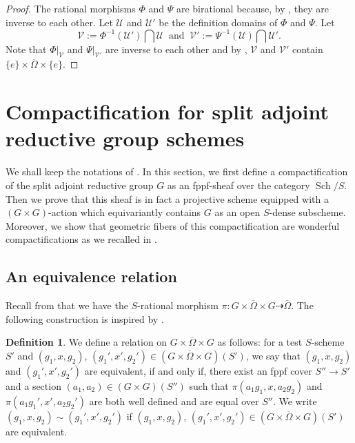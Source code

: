 \documentclass[11pt, reqno]{amsart}
\theoremstyle{plain}
\theoremstyle{definition}
\newtheorem{definition}[theorem]{Definition}
\DeclareMathOperator{\Sch}{Sch}
\begin{document}
\begin{proof}
    The rational morphisms $\Phi$ and $\Psi$ are birational because, by , they are inverse to each other. 
    Let $\mathcal{U}$ and $\mathcal{U}'$ be the definition domains of $\Phi$ and $\Psi$. 
    Let $$\mathcal{V}:=\Phi^{-1}(\mathcal{U'})\bigcap \mathcal{U}\;\; \text{and}\;\; \mathcal{V}':=\Psi^{-1}(\mathcal{U})\bigcap \mathcal{U}'.$$
    Note that $\Phi\vert_{\mathcal{V}}$ and $\Psi\vert_{\mathcal{V}'}$ are inverse to each other and by , $\mathcal{V}$ and $\mathcal{V}'$ contain $\{e\}\times\overline{\Omega}\times\{e\}$.
\end{proof}

















\section{Compactification for split adjoint reductive group schemes}\label{sectioncompactification}
We shall keep the notations of . In this section, we first define a compactification of the split adjoint reductive group $G$ as an fppf-sheaf over the category $\Sch/S$. Then we prove that this sheaf is in fact a projective scheme equipped with a $(G\times G)$-action which equivariantly contains $G$ as an open $S$-dense subscheme. Moreover, we show that geometric fibers of this compactification are wonderful compactifications as we recalled in . 

\subsection{An equivalence relation}
Recall from  that we have the $S$-rational morphism $\pi\colon G\times\overline{\Omega}\times G\dashrightarrow \overline{\Omega}$. The following construction is inspired by \cite[exposé~XVIII, 3.2.3]{SGA3II}. 

\begin{definition}\label{relationonOmega}
     We define a relation on $G\times\overline{\Omega}\times G$ as follows:
     for a test $S$-scheme $S'$ and $(g_1, x, g_2)$, $(g_1', x', g_2')\in( G\times\overline{\Omega}\times G )(S')$, we say that $(g_1, x, g_2)$ and $(g_1', x', g_2')$ are equivalent, if and only if, there exist an fppf cover $S''\rightarrow S'$ and a section $(a_1, a_2)\in ( G\times G)(S'')$   such that $\pi(a_1g_1,x,a_2g_2)$ and $\pi(a_1g_1',x',a_2g_2')$ are both well defined and are equal over $S''$. We write $(g_1, x, g_2)\sim(g_1', x', g_2')$ if  $(g_1, x, g_2)$, $(g_1', x', g_2')\in ( G\times\overline{\Omega}\times G)(S')$ are equivalent.
\end{definition}
\end{document}
